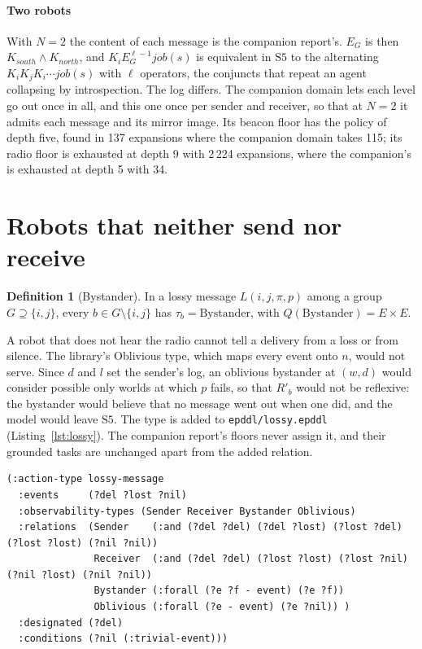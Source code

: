 \documentclass[11pt,a4paper]{article}
\theoremstyle{definition}
\newtheorem{definition}{Definition}
\newcommand{\Kop}[1]{K_{#1}}
\newcommand{\Eop}[1]{E_{#1}}
\newcommand{\code}[1]{\texttt{\small #1}}
\newcommand{\ag}[1]{\mathit{#1}}
\newcommand{\job}{\mathit{job}}
\begin{document}
\paragraph{Two robots} With $N = 2$ the content of each message is the
companion report's. $\Eop{G}$ is then $\Kop{\ag{south}} \wedge
\Kop{\ag{north}}$, and $\Kop{i}\Eop{G}^{\ell-1}\job(s)$ is equivalent in
$\mathrm{S5}$ to the alternating $\Kop{i}\Kop{j}\Kop{i}\cdots\job(s)$ with
$\ell$ operators, the conjuncts that repeat an agent collapsing by
introspection. The log differs. The companion domain lets each level go out
once in all, and this one once per sender and receiver, so that at $N = 2$ it
admits each message and its mirror image. Its beacon floor has the policy of
depth five, found in 137 expansions where the companion domain takes 115; its
radio floor is exhausted at depth 9 with 2\,224 expansions, where the
companion's is exhausted at depth 5 with 34.

\section{Robots that neither send nor receive}
\label{sec:bystanders}

\begin{definition}[Bystander]
\label{def:bystander}
In a lossy message $L(i,j,\pi,p)$ among a group $G \supseteq \{i,j\}$, every
$b \in G \setminus \{i,j\}$ has $\tau_b = \mathrm{Bystander}$, with
$Q(\mathrm{Bystander}) = E \times E$.
\end{definition}

A robot that does not hear the radio cannot tell a delivery from a loss or from
silence. The library's Oblivious type, which maps every event onto $n$, would
not serve. Since $d$ and $l$ set the sender's log, an oblivious bystander at
$(w,d)$ would consider possible only worlds at which $p$ fails, so that $R'_b$
would not be reflexive: the bystander would believe that no message went out
when one did, and the model would leave $\mathrm{S5}$. The type is added to
\code{epddl/lossy.epddl} (Listing~\ref{lst:lossy}). The companion report's
floors never assign it, and their grounded tasks are unchanged apart from the
added relation.

\begin{lstlisting}[caption={The action type, in \code{epddl/lossy.epddl}, with the bystander type.}, label={lst:lossy}]
(:action-type lossy-message
  :events     (?del ?lost ?nil)
  :observability-types (Sender Receiver Bystander Oblivious)
  :relations  (Sender    (:and (?del ?del) (?del ?lost) (?lost ?del) (?lost ?lost) (?nil ?nil))
               Receiver  (:and (?del ?del) (?lost ?lost) (?lost ?nil) (?nil ?lost) (?nil ?nil))
               Bystander (:forall (?e ?f - event) (?e ?f))
               Oblivious (:forall (?e - event) (?e ?nil)) )
  :designated (?del)
  :conditions (?nil (:trivial-event)))
\end{lstlisting}
\end{document}
